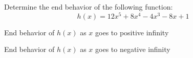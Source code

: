 \documentclass{ximera}
\author{David Kish}
\begin{document}
\begin{exercise}
Determine the end behavior of the following function:
\[
h(x)=12x^5+8x^4-4x^3-8x+1
\]
\begin{exercise}
End behavior of $h(x)$ as $x$ goes to positive infinity
\begin{multipleChoice}
\end{multipleChoice}
\end{exercise}
\begin{exercise}
End behavior of $h(x)$ as $x$ goes to negative infinity
\begin{multipleChoice}
\end{multipleChoice}
\end{exercise}

\end{exercise}
\end{document}
